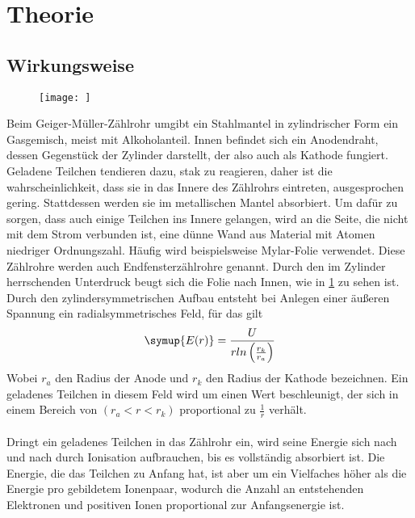 \section{Theorie}
\label{sec:Theorie}

\subsection{Wirkungsweise}
\begin{figure}
 \centering
 \texttt{[image: ]}
 \label{fig:aufn}
\end{figure}

Beim Geiger-Müller-Zählrohr umgibt ein Stahlmantel in zylindrischer Form
ein Gasgemisch, meist mit Alkoholanteil. Innen befindet sich ein Anodendraht,
dessen Gegenstück der Zylinder darstellt, der also auch als Kathode fungiert.\\
Geladene Teilchen tendieren dazu, stak zu reagieren, daher ist die wahrscheinlichkeit,
dass sie in das Innere des Zählrohrs eintreten, ausgesprochen gering. 
Stattdessen werden sie im metallischen Mantel absorbiert. Um dafür zu 
sorgen, dass auch einige Teilchen ins Innere gelangen, wird an die Seite,
die nicht mit dem Strom verbunden ist, eine dünne Wand aus Material mit Atomen
niedriger Ordnungszahl. Häufig wird beispielsweise Mylar-Folie verwendet. 
Diese Zählrohre werden auch Endfensterzählrohre genannt. Durch den im Zylinder
herrschenden Unterdruck beugt sich die Folie nach Innen, wie in \ref{fig:aufn} 
zu sehen ist.\\
Durch den zylindersymmetrischen Aufbau entsteht bei Anlegen einer äußeren Spannung
ein radialsymmetrisches Feld, für das gilt
\begin{equation}
\symup{E(r) }= \frac{U}{r ln\left(\frac{r_k}{r_a} \right) } 
\end{equation}
Wobei $r_a$ den Radius der Anode und $r_k$ den Radius der Kathode bezeichnen.
Ein geladenes Teilchen in diesem Feld wird um einen Wert beschleunigt, der
sich in einem Bereich von $\left( r_a < r < r_k \right)$ proportional zu $\frac{1}{r}$ 
verhält. \\
\\
Dringt ein geladenes Teilchen in das Zählrohr ein, wird seine Energie 
sich nach und nach durch Ionisation aufbrauchen, bis es vollständig absorbiert
ist. Die Energie, die das Teilchen zu Anfang hat, ist aber um ein Vielfaches
höher als die Energie pro gebildetem Ionenpaar, wodurch die Anzahl an 
entstehenden Elektronen und positiven Ionen proportional zur Anfangsenergie
ist. \\
